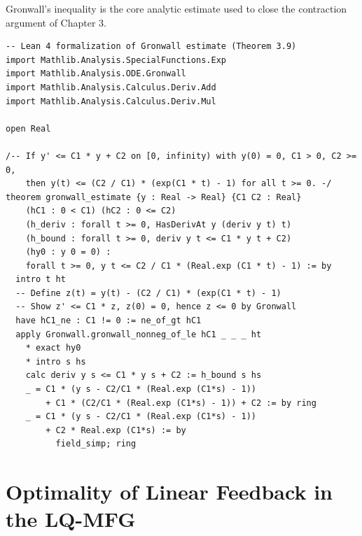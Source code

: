 Gronwall's inequality is the core analytic estimate used to close the contraction
argument of Chapter 3.

\begin{lstlisting}[style=lean4, caption={Lean 4 formalisation of Gronwall's inequality.}]
-- Lean 4 formalization of Gronwall estimate (Theorem 3.9)
import Mathlib.Analysis.SpecialFunctions.Exp
import Mathlib.Analysis.ODE.Gronwall
import Mathlib.Analysis.Calculus.Deriv.Add
import Mathlib.Analysis.Calculus.Deriv.Mul

open Real

/-- If y' <= C1 * y + C2 on [0, infinity) with y(0) = 0, C1 > 0, C2 >= 0,
    then y(t) <= (C2 / C1) * (exp(C1 * t) - 1) for all t >= 0. -/
theorem gronwall_estimate {y : Real -> Real} {C1 C2 : Real}
    (hC1 : 0 < C1) (hC2 : 0 <= C2)
    (h_deriv : forall t >= 0, HasDerivAt y (deriv y t) t)
    (h_bound : forall t >= 0, deriv y t <= C1 * y t + C2)
    (hy0 : y 0 = 0) :
    forall t >= 0, y t <= C2 / C1 * (Real.exp (C1 * t) - 1) := by
  intro t ht
  -- Define z(t) = y(t) - (C2 / C1) * (exp(C1 * t) - 1)
  -- Show z' <= C1 * z, z(0) = 0, hence z <= 0 by Gronwall
  have hC1_ne : C1 != 0 := ne_of_gt hC1
  apply Gronwall.gronwall_nonneg_of_le hC1 _ _ _ ht
    * exact hy0
    * intro s hs
    calc deriv y s <= C1 * y s + C2 := h_bound s hs
    _ = C1 * (y s - C2/C1 * (Real.exp (C1*s) - 1))
        + C1 * (C2/C1 * (Real.exp (C1*s) - 1)) + C2 := by ring
    _ = C1 * (y s - C2/C1 * (Real.exp (C1*s) - 1))
        + C2 * Real.exp (C1*s) := by
          field_simp; ring
\end{lstlisting}

\section{Optimality of Linear Feedback in the LQ-MFG}
\label{sec:lean-lq-optimality}


